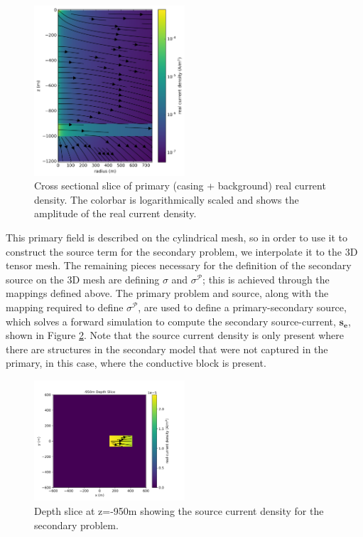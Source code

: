 {%
\begin{figure}[htb!]
    \centering
    \includegraphics[width=0.5\textwidth]{images/primaryCurrents.png}
\caption{Cross sectional slice of primary (casing + background) real current density. The colorbar is logarithmically scaled and shows the amplitude of the real current density. }
\label{fig:casingPrimaryFields}
\end{figure}
}

This primary field is described on the cylindrical mesh, so in order to use it
to construct the source term for the secondary problem, we interpolate
it to the 3D tensor mesh. The remaining pieces necessary for the definition of
the secondary source on the 3D mesh are defining $\sigma$ and $\sigma^\mathcal{P}$; this
is achieved through the mappings defined above. The primary problem and
source, along with the mapping required to define $\sigma^\mathcal{P}$, are used to
define a primary-secondary source, which solves a forward simulation to
compute the secondary source-current, $\mathbf{s_e}$, shown in Figure
\ref{fig:casingSecondary}. Note that the source current density is only
present where there are structures in the secondary model that were not
captured in the primary, in this case, where the conductive block is present.

{%
\begin{figure}[htb!]
    \centering
    \includegraphics[width=0.5\textwidth]{images/secondarySource.png}
\caption{Depth slice at z=-950m showing the source current density for the secondary problem.}
\label{fig:casingSecondary}
\end{figure}
}

